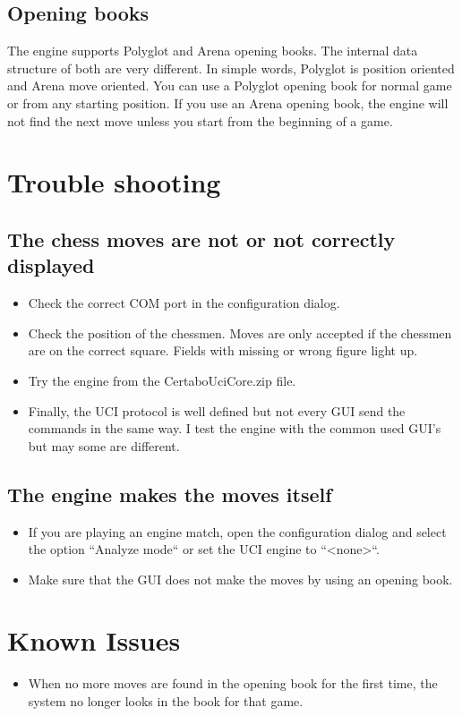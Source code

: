 \documentclass[11pt,a4paper]{article}
\begin{document}
\subsection{Opening books}
The engine supports Polyglot and Arena opening books. The internal data structure of both are very different. In simple words, Polyglot is position oriented and Arena move oriented. You can use a Polyglot opening book for normal game or from any starting position. If you use an Arena opening book, the engine will not find the next move unless you start from the beginning of a game.

\section{Trouble shooting}


\subsection{The chess moves are not or not correctly displayed}
\begin{itemize}
	\item Check the correct COM port in the configuration dialog.
	\item Check the position of the chessmen. Moves are only accepted if the chessmen are on the correct square. Fields with missing or wrong figure light up.
	\item Try the engine from the CertaboUciCore.zip file.
	\item Finally, the UCI protocol is well defined but not every GUI send the commands in the same way. I test the engine with the common used GUI's but may some are different.
\end{itemize}

\subsection{The engine makes the moves itself}
\begin{itemize}
\item If you are playing an engine match, open the configuration dialog and select the option ``Analyze mode`` or set the UCI engine to ``<none>``.
\item Make sure that the GUI does not make the moves by using an opening book.
\end{itemize}

\section{Known Issues}
\begin{itemize}
	\item When no more moves are found in the opening book for the first time, the system no longer looks in the book for that game.
\end{itemize}
\end{document}
